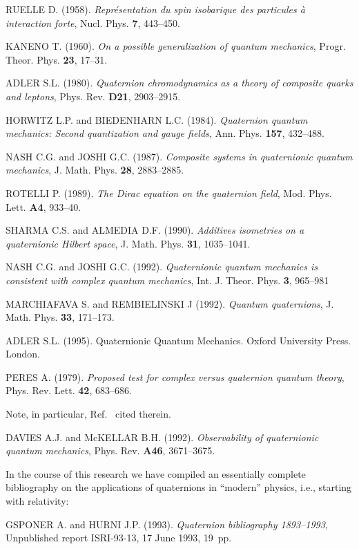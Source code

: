 \documentclass [12pt,a4paper      ]{article}
\begin{document}
\begin{enumerate}
RUELLE D. (1958). \emph{Repr\'esentation du spin isobarique des particules \`a 
interaction forte},  Nucl. Phys.   {\bf 7}, 443--450.

KANENO T. (1960). \emph{On a possible generalization of quantum mechanics}, 
 Progr. Theor. Phys.   {\bf 23}, 17--31.     

ADLER  S.L.   (1980).  \emph{Quaternion  chromodynamics  as  a  theory  of 
composite quarks and leptons},  Phys. Rev.   {\bf D21}, 2903--2915.

HORWITZ  L.P.   and  BIEDENHARN  L.C.   (1984). \emph{Quaternion  quantum 
mechanics:  Second quantization and gauge fields}, Ann. Phys.  
 {\bf 157}, 432--488.

NASH C.G.  and JOSHI G.C.  (1987). \emph{Composite systems in quaternionic 
quantum mechanics},  J. Math. Phys.   {\bf 28}, 2883--2885.

ROTELLI P.  (1989). \emph{The Dirac equation on the quaternion field},  Mod. 
Phys. Lett.   {\bf A4}, 933--40.

SHARMA  C.S.  and  ALMEDIA D.F.  (1990). \emph{Additives isometries  on  a 
quaternionic Hilbert space},  J. Math. Phys.   {\bf 31}, 1035--1041.

NASH C.G.  and JOSHI G.C.  (1992). \emph{Quaternionic quantum mechanics is 
consistent with complex quantum mechanics},  Int.  J. Theor. Phys.  
 {\bf 3}, 965--981

MARCHIAFAVA S.  and REMBIELINSKI J (1992). \emph{Quantum  quaternions}, 
 J. Math. Phys.   {\bf 33}, 171--173.

  ADLER  S.L.  (1995). Quaternionic  Quantum  Mechanics.   
Oxford University Press. London.

  PERES A.  (1979). \emph{Proposed test for complex versus quaternion quantum theory}, Phys. Rev. Lett.   {\bf 42}, 683--686.

Note, in particular, Ref.~\cite{R18} cited therein.

  DAVIES  A.J.   and  McKELLAR  B.H.  (1992).  \emph{Observability  of quaternionic quantum mechanics}, Phys. Rev.   {\bf A46}, 3671--3675.

  In  the  course  of  this  research  we  have  compiled  an 
essentially   complete   bibliography  on  the  applications   of 
quaternions in ``modern'' physics,  i.e.,  starting with relativity:

  
GSPONER A. and HURNI J.P. (1993). \emph{Quaternion bibliography 1893--1993},  Unpublished report ISRI-93-13, 17 June 1993, 19~pp.  


\end{enumerate}
\end{document}
